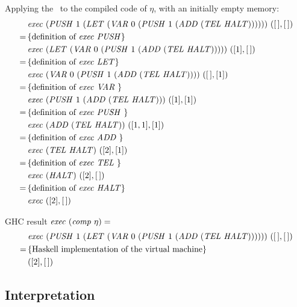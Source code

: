 \documentclass {article}
\begin{document}
Applying the \vm\ to the compiled code of $\eta$,
with an initially empty memory:
\begin{align*}
&\Exec (\PUSH 1\ (\LET 
	(\VAR 0\ (\PUSH 1\ 
		(\ADD (\TEL \HALT))))))\ ([\, ],[\, ]) \\
=\, & \{ \mbox{definition of \exec\ \PUSHt} \}\ \\ 
&\Exec (\LET 
	(\VAR 0\ (\PUSH 1\ 
		(\ADD (\TEL \HALT)))))\ ([1],[\, ]) \\
=\, & \{ \mbox{definition of \exec\ \LETt} \}\ \\ 
&\Exec (\VAR 0\ (\PUSH 1\ 
		(\ADD (\TEL \HALT))))\ ([\, ],[1]) \\
=\, & \{ \mbox{definition of \exec\ }\VAR \}\ \\ 
&\Exec (\PUSH 1\ 
		(\ADD (\TEL \HALT)))\ ([1],[1]) \\
=\, & \{ \mbox{definition of \exec\ }\PUSH \}\ \\ 
&\Exec (\ADD (\TEL \HALT))\ ([1, 1],[1]) \\
=\, & \{ \mbox{definition of \exec\ }\ADD \}\ \\ 
&\Exec (\TEL \HALT)\ ([2],[1]) \\
=\, & \{ \mbox{definition of \exec\ }\TEL \}\ \\ 
&\Exec (\HALT)\ ([2],[\, ]) \\
=\, & \{ \mbox{definition of \exec\ }\HALT \}\ \\ 
&\Exec ([2],[\, ]) \\
\end{align*}

GHC result \( \mathit{exec\ } (\mathit{comp\ } \eta) = \)
\begin{align*}
&\Exec (\PUSH 1\ (\LET 
	(\VAR 0\ (\PUSH 1\ 
		(\ADD (\TEL \HALT))))))\ ([\, ],[\, ])\\
=\, & \{ \mbox{Haskell implementation of the \vm} \} \\
&([2],[\, ])
\end{align*}

\subsection{Interpretation}
\end{document}
